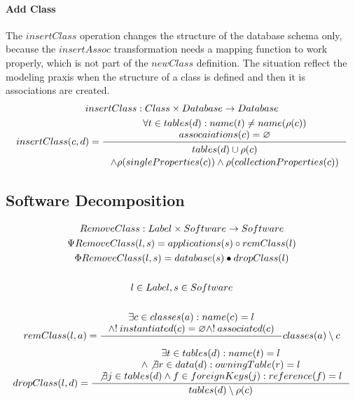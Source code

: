 \documentclass[11pt]{article}
\begin{document}
\paragraph{Add Class} The $insertClass$ operation changes the structure of the database schema only, because the $insertAssoc$ transformation needs a mapping function to work properly, which is not part of the $newClass$ definition. The situation reflect the modeling praxis when the structure of a class is defined and then it is associations are created.
\begin{gather*}
insertClass : Class \times Database \rightarrow Database \\
insertClass(c, d) = \inference{ \forall t \in tables(d) : name(t) \neq name(\rho(c)) \\
	assocaiations(c) = \varnothing
}{
\begin{gathered}
  tables(d) \cup \rho(c) \\ \wedge \rho(singleProperties(c)) \wedge \rho(collectionProperties(c)) \\ 
\end{gathered}
}
\end{gather*}



\subsection{Software Decomposition}
\begin{gather*}
RemoveClass: Label \times Software \rightarrow Software  \\
\Psi RemoveClass(l, s) = applications(s) \circ remClass(l) \\
\Phi RemoveClass(l, s) = database(s) \bullet dropClass(l) \\
\\ l \in Label, s \in Software 
\\ \\
remClass(l, a) = \inference{\exists c \in classes(a) : name(c) = l \\
\wedge !\: instantiated(c) = \varnothing \wedge !\: associated(c)} {classes(a) \setminus c } \\
\end{gather*}
\begin{gather*}
dropClass(l,d) = \inference{ \exists t \in tables(d) : name(t) = l  \\ \wedge \not \exists r \in data(d) : owningTable(r) = l \\  \not \exists j \in tables(d) \wedge f \in foreignKeys(j) : reference(f) = l }{ tables(d) \setminus \rho(c)}
\end{gather*}
\end{document}
